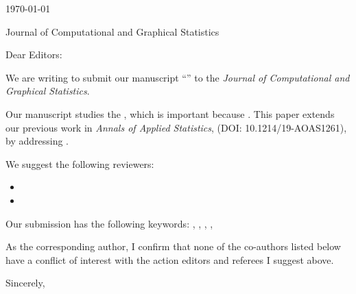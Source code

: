 


\hfill{\today}

Journal of Computational and Graphical Statistics

\bigskip

Dear Editors:

We are writing to submit our manuscript ``'' to the \emph{Journal of Computational and Graphical Statistics}.

Our manuscript studies the , which is important because . This paper extends our previous work in \emph{Annals of Applied Statistics},  (DOI: 10.1214/19-AOAS1261), by addressing . 

We suggest the following reviewers:
\begin{itemize}
    \item {}
    \item {}
\end{itemize}


Our submission has the following keywords: , , , , 

As the corresponding author, I confirm that none of the co-authors listed below have a conflict of interest with the action editors and referees I suggest above.

\bigskip

Sincerely,

\medskip

